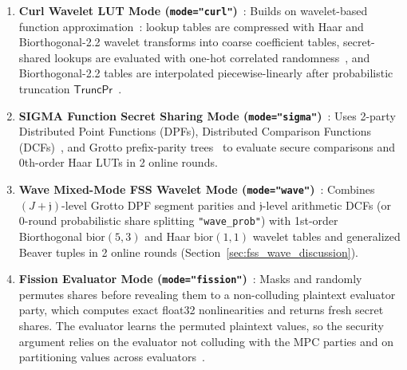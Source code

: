 \documentclass[11pt]{article}
\begin{document}
\begin{enumerate}
    For $\operatorname{Softmax}$, SHAFT integrates the differential equation $y'(t) = y(t) \odot (x - \langle y(t), x \rangle)$ over $t \in [0, 1]$ using a fixed number of Forward-Euler steps, without any division, reciprocal, or secure $\max$.
    \item \textbf{Curl Wavelet LUT Mode (\texttt{mode="curl"})}~\cite{santos2024curl}: Builds on wavelet-based function approximation~\cite{gouert2024ripple,reis2025wave}: lookup tables are compressed with Haar and Biorthogonal-2.2 wavelet transforms into coarse coefficient tables, secret-shared lookups are evaluated with one-hot correlated randomness~\cite{santos2024curl}, and Biorthogonal-2.2 tables are interpolated piecewise-linearly after probabilistic truncation $\mathsf{TruncPr}$~\cite{escudero2020improved}.
    \item \textbf{SIGMA Function Secret Sharing Mode (\texttt{mode="sigma"})}~\cite{gupta2024sigma}: Uses 2-party Distributed Point Functions (DPFs), Distributed Comparison Functions (DCFs)~\cite{boyle2015function,boyle2016function}, and Grotto prefix-parity trees~\cite{storrier2023grotto} to evaluate secure comparisons and 0th-order Haar LUTs in 2 online rounds.
    \item \textbf{Wave Mixed-Mode FSS Wavelet Mode (\texttt{mode="wave"})}~\cite{reis2025wave}: Combines $(J+\mathfrak{j})$-level Grotto DPF segment parities and $\mathfrak{j}$-level arithmetic DCFs (or 0-round probabilistic share splitting \texttt{"wave\_prob"}) with 1st-order Biorthogonal $\text{bior}(5,3)$ and Haar $\text{bior}(1,1)$ wavelet tables and generalized Beaver tuples in 2 online rounds (Section~\ref{sec:fss_wave_discussion}).
    \item \textbf{Fission Evaluator Mode (\texttt{mode="fission"})}~\cite{ugurbil2025fission}: Masks and randomly permutes shares before revealing them to a non-colluding plaintext evaluator party, which computes exact float32 nonlinearities and returns fresh secret shares. The evaluator learns the permuted plaintext values, so the security argument relies on the evaluator not colluding with the MPC parties and on partitioning values across evaluators~\cite{ugurbil2025fission}.
\end{enumerate}
\end{document}
